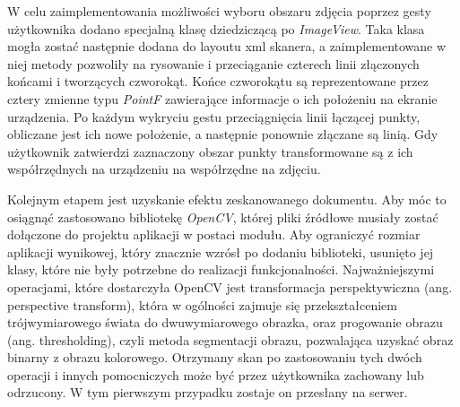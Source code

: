 \documentclass[10pt,twoside,a4paper]{report}
\begin{document}
\par W celu zaimplementowania możliwości wyboru obszaru zdjęcia poprzez gesty użytkownika dodano specjalną klasę dziedziczącą po \textit{ImageView}. Taka klasa mogła zostać następnie dodana do layoutu xml skanera, a zaimplementowane w niej metody pozwoliły na rysowanie i przeciąganie czterech linii złączonych końcami i tworzących czworokąt. Końce czworokątu są reprezentowane przez cztery zmienne typu \textit{PointF} zawierające informacje o ich położeniu na ekranie urządzenia. Po każdym wykryciu gestu przeciągnięcia linii łączącej punkty, obliczane jest ich nowe położenie, a następnie ponownie złączane są linią. Gdy użytkownik zatwierdzi zaznaczony obszar punkty transformowane są z ich współrzędnych na urządzeniu na współrzędne na zdjęciu.

\par Kolejnym etapem jest uzyskanie efektu zeskanowanego dokumentu. Aby móc to osiągnąć zastosowano bibliotekę \textit{OpenCV}\cite{OpenCV}, której pliki źródłowe musiały zostać dołączone do projektu aplikacji w postaci modułu. Aby ograniczyć rozmiar aplikacji wynikowej, który znacznie wzrósł po dodaniu biblioteki, usunięto jej klasy, które nie były potrzebne do realizacji funkcjonalności. Najważniejszymi operacjami, które dostarczyła OpenCV jest transformacja perspektywiczna (ang. perspective transform), która w ogólności zajmuje się przekształceniem trójwymiarowego świata do dwuwymiarowego obrazka, oraz progowanie obrazu (ang. thresholding), czyli metoda segmentacji obrazu, pozwalająca uzyskać obraz binarny z obrazu kolorowego. Otrzymany skan po zastosowaniu tych dwóch operacji i innych pomocniczych może być przez użytkownika zachowany lub odrzucony. W tym pierwszym przypadku zostaje on przesłany na serwer.
\end{document}
